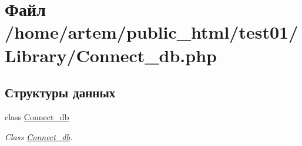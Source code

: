 \hypertarget{_connect__db_8php}{\section{Файл /home/artem/public\-\_\-html/test01/\-Library/\-Connect\-\_\-db.php}
\label{_connect__db_8php}
}
\subsection*{Структуры данных}
\begin{DoxyCompactItemize}
\item 
class \hyperlink{class_connect__db}{Connect\-\_\-db}
\begin{DoxyCompactList}\small\item\em Class \hyperlink{class_connect__db}{Connect\-\_\-db}. \end{DoxyCompactList}\end{DoxyCompactItemize}
